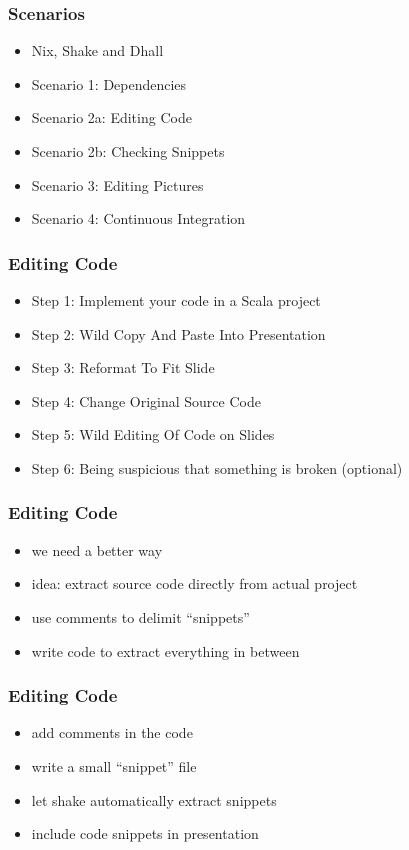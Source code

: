 \documentclass{beamer}
\begin{document}
\begin{frame}
  \frametitle{Scenarios}
  \begin{itemize}
  \item Nix, Shake and Dhall
  \item Scenario 1: Dependencies
  \item Scenario 2a: Editing Code
  \item Scenario 2b: Checking Snippets
  \item Scenario 3: Editing Pictures
  \item Scenario 4: Continuous Integration
  \end{itemize}
\end{frame}

\begin{frame}
  \frametitle{Editing Code}
  \begin{itemize}
  \item Step 1: Implement your code in a Scala project
  \item Step 2: Wild Copy And Paste Into Presentation
  \item Step 3: Reformat To Fit Slide
  \item Step 4: Change Original Source Code
  \item Step 5: Wild Editing Of Code on Slides
  \item Step 6: Being suspicious that something is broken (optional)
  \end{itemize}
\end{frame}

\begin{frame}
  \frametitle{Editing Code}
  \begin{itemize}
  \item we need a better way
  \item idea: extract source code directly from actual project
  \item use comments to delimit ``snippets''
  \item write code to extract everything in between
  \end{itemize}
\end{frame}

\begin{frame}
  \frametitle{Editing Code}
  \begin{itemize}
  \item add comments in the code
  \item write a small ``snippet'' file
  \item let shake automatically extract snippets
  \item include code snippets in presentation
  \end{itemize}
\end{frame}
\end{document}
